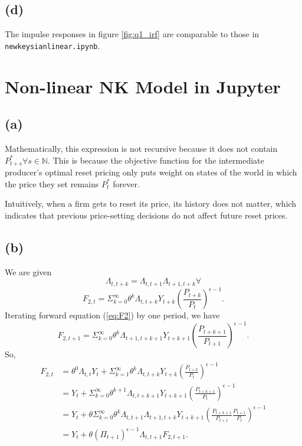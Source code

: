 \documentclass[12pt]{article}
\begin{document}
\subsection*{(d)}

The impulse responses in figure \ref{fig:q1_irf} are comparable to those in \texttt{newkeysianlinear.ipynb}.

\section{Non-linear NK Model in Jupyter}

\subsection*{(a)}

Mathematically, this expression is not recursive because it does not contain $P^{\ast}_{t+s} \forall s \in \mathbb{N}$. 
This is because the objective function for the intermediate producer's optimal reset pricing 
only puts weight on states of the world in which the price they set remains $P^{\ast}_{t}$ forever. 

Intuitively, when a firm gets to reset its price, its history does not matter,
which indicates that previous price-setting decisions do not affect future reset prices. 

\subsection*{(b)}

We are given 
\begin{equation}
\label{eq:lambda}
\Lambda_{t,t+k} = \Lambda_{t,t+1}\Lambda_{t+1,t+k} \forall
\end{equation}
\begin{equation}
\label{eq:F2}
F_{2,t} = \Sigma^{\infty}_{k=0}\theta^{k}\Lambda_{t,t+k}Y_{t+k}\left(\frac{P_{t+k}}{P_{t}}\right)^{\epsilon-1}.
\end{equation}
Iterating forward equation (\ref{eq:F2}) by one period, we have
\begin{equation}
\label{eq:F2prime}
F_{2,t+1} = \Sigma^{\infty}_{k=0}\theta^{k}\Lambda_{t+1,t+k+1}Y_{t+k+1}\left(\frac{P_{t+k+1}}{P_{t+1}}\right)^{\epsilon-1}.
\end{equation}
So,
\begin{align*}
F_{2,t} &= \theta^{0}\Lambda_{t,t}Y_{t} + \Sigma^{\infty}_{k=1} \theta^{k}\Lambda_{t,t+k}Y_{t+k}\left(\frac{P_{t+k}}{P_{t}}\right)^{\epsilon-1} \\
&= Y_{t} + \Sigma^{\infty}_{k=0} \theta^{k+1}\Lambda_{t,t+k+1}Y_{t+k+1}\left(\frac{P_{t+k+1}}{P_{t}}\right)^{\epsilon-1} \\
&= Y_{t} + \theta \Sigma^{\infty}_{k=0} \theta^{k}\Lambda_{t,t+1}\Lambda_{t+1,t+k}Y_{t+k+1}\left(\frac{P_{t+k+1}}{P_{t+1}}\frac{P_{t+1}}{P_{t}}\right)^{\epsilon-1} \\
&= Y_{t} + \theta\left(\Pi_{t+1}\right)^{\epsilon-1}\Lambda_{t,t+1}F_{2,t+1}.
\end{align*}
\end{document}
